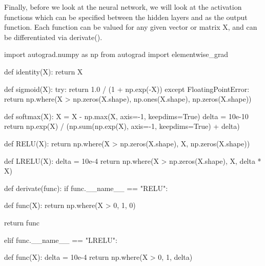 \documentclass[%
oneside,                 %
final,                   %
10pt]{article}
\begin{document}
Finally, before we look at the neural network, we will look at the
activation functions which can be specified between the hidden layers
and as the output function. Each function can be valued for any given
vector or matrix X, and can be differentiated via derivate().

















































\bpycod
import autograd.numpy as np
from autograd import elementwise_grad

def identity(X):
    return X


def sigmoid(X):
    try:
        return 1.0 / (1 + np.exp(-X))
    except FloatingPointError:
        return np.where(X > np.zeros(X.shape), np.ones(X.shape), np.zeros(X.shape))


def softmax(X):
    X = X - np.max(X, axis=-1, keepdims=True)
    delta = 10e-10
    return np.exp(X) / (np.sum(np.exp(X), axis=-1, keepdims=True) + delta)


def RELU(X):
    return np.where(X > np.zeros(X.shape), X, np.zeros(X.shape))


def LRELU(X):
    delta = 10e-4
    return np.where(X > np.zeros(X.shape), X, delta * X)


def derivate(func):
    if func.__name__ == "RELU":

        def func(X):
            return np.where(X > 0, 1, 0)

        return func

    elif func.__name__ == "LRELU":

        def func(X):
            delta = 10e-4
            return np.where(X > 0, 1, delta)
\end{document}
